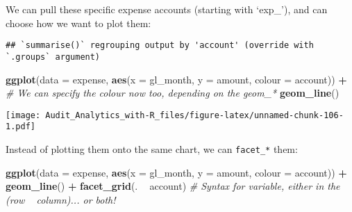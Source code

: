 \documentclass[
]{book}
\newenvironment{Shaded}{\begin{snugshade}}{\end{snugshade}}
\newcommand{\CommentTok}[1]{\textcolor[rgb]{0.56,0.35,0.01}{\textit{#1}}}
\newcommand{\DataTypeTok}[1]{\textcolor[rgb]{0.13,0.29,0.53}{#1}}
\newcommand{\KeywordTok}[1]{\textcolor[rgb]{0.13,0.29,0.53}{\textbf{#1}}}
\newcommand{\NormalTok}[1]{#1}
\newcommand{\OperatorTok}[1]{\textcolor[rgb]{0.81,0.36,0.00}{\textbf{#1}}}
\newcommand{\StringTok}[1]{\textcolor[rgb]{0.31,0.60,0.02}{#1}}
\begin{document}
We can pull these specific expense accounts (starting with `exp\_'), and can choose how we want to plot them:

\begin{Shaded}
\end{Shaded}

\begin{verbatim}
## `summarise()` regrouping output by 'account' (override with `.groups` argument)
\end{verbatim}

\begin{Shaded}
\begin{Highlighting}[]
\KeywordTok{ggplot}\NormalTok{(}\DataTypeTok{data =}\NormalTok{ expense, }\KeywordTok{aes}\NormalTok{(}\DataTypeTok{x =}\NormalTok{ gl_month, }\DataTypeTok{y =}\NormalTok{ amount, }\DataTypeTok{colour =}\NormalTok{ account)) }\OperatorTok{+}\StringTok{ }\CommentTok{# We can specify the colour now too, depending on the geom_*}
\StringTok{  }\KeywordTok{geom_line}\NormalTok{()}
\end{Highlighting}
\end{Shaded}

\texttt{[image: Audit\_Analytics\_with-R\_files/figure-latex/unnamed-chunk-106-1.pdf]}

Instead of plotting them onto the same chart, we can \texttt{facet\_*} them:

\begin{Shaded}
\begin{Highlighting}[]
\KeywordTok{ggplot}\NormalTok{(}\DataTypeTok{data =}\NormalTok{ expense, }\KeywordTok{aes}\NormalTok{(}\DataTypeTok{x =}\NormalTok{ gl_month, }\DataTypeTok{y =}\NormalTok{ amount, }\DataTypeTok{colour =}\NormalTok{ account)) }\OperatorTok{+}
\StringTok{  }\KeywordTok{geom_line}\NormalTok{() }\OperatorTok{+}
\StringTok{  }\KeywordTok{facet_grid}\NormalTok{(. }\OperatorTok{~}\StringTok{ }\NormalTok{account) }\CommentTok{# Syntax for variable, either in the (row ~ column)... or both!}
\end{Highlighting}
\end{Shaded}
\end{document}
